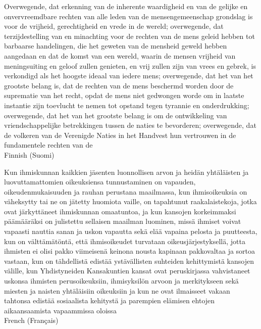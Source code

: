 \documentclass[12pt]{article}
\begin{document}
Overwegende, dat erkenning van de inherente waardigheid en van de gelijke en onvervreemdbare rechten van alle leden van de mensengemeenschap grondslag is voor de vrijheid, gerechtigheid en vrede in de wereld; overwegende, dat terzijdestelling van en minachting voor de rechten van de mens geleid hebben tot barbaarse handelingen, die het geweten van de mensheid geweld hebben aangedaan en dat de komst van een wereld, waarin de mensen vrijheid van meningsuiting en geloof zullen genieten, en vrij zullen zijn van vrees en gebrek, is verkondigd als het hoogste ideaal van iedere mens; overwegende, dat het van het grootste belang is, dat de rechten van de mens beschermd worden door de suprematie van het recht, opdat de mens niet gedwongen worde om in laatste instantie zijn toevlucht te nemen tot opstand tegen tyrannie en onderdrukking; overwegende, dat het van het grootste belang is om de ontwikkeling van vriendschappelijke betrekkingen tussen de naties te bevorderen; overwegende, dat de volkeren van de Verenigde Naties in het Handvest hun vertrouwen in de fundamentele rechten van de\\

Finnish (Suomi) 

Kun ihmiskunnan kaikkien jäsenten luonnollisen arvon ja heidän yhtäläisten ja luovuttamattomien oikeuksiensa tunnustaminen on vapauden, oikeudenmukaisuuden ja rauhan perustana maailmassa, kun ihmisoikeuksia on väheksytty tai ne on jätetty huomiota vaille, on tapahtunut raakalaistekoja, jotka ovat järkyttäneet ihmiskunnan omaatuntoa, ja kun kansojen korkeimmaksi päämääräksi on julistettu sellaisen maailman luominen, missä ihmiset voivat vapaasti nauttia sanan ja uskon vapautta sekä elää vapaina pelosta ja puutteesta, kun on välttämätöntä, että ihmisoikeudet turvataan oikeusjärjestyksellä, jotta ihmisten ei olisi pakko viimeisenä keinona nousta kapinaan pakkovaltaa ja sortoa vastaan, kun on tähdellistä edistää ystävällisten suhteiden kehittymistä kansojen välille, kun Yhdistyneiden Kansakuntien kansat ovat peruskirjassa vahvistaneet uskonsa ihmisten perusoikeuksiin, ihmisyksilön arvoon ja merkitykseen sekä miesten ja naisten yhtäläisiin oikeuksiin ja kun ne ovat ilmaisseet vakaan tahtonsa edistää sosiaalista kehitystä ja parempien elämisen ehtojen aikaan\-saa\-mista vapaammissa oloissa\\

French (Français)
\end{document}
